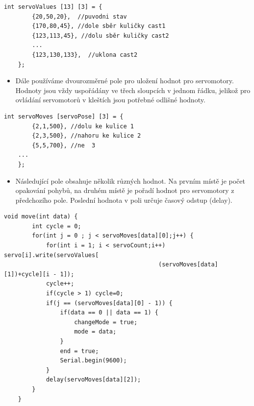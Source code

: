 \documentclass[12pt, a4paper,
twoside,        %
openright
]{report}
\begin{document}
{\begin{itemize}
	
\end{itemize}
	
\begin{lstlisting}[style=Python, caption={Dvourozměrné pole na potřebné hodnoty}]
	 int servoValues [13] [3] = {
		{20,50,20},  //puvodni stav 
		{170,80,45}, //dole sběr kuličky cast1
		{123,113,45}, //dolu sběr kuličky cast2
		...
		{123,130,133},  //uklona cast2
	};
		\end{lstlisting}
		
\begin{itemize}
	\item Dále používáme dvourozměrné pole pro uložení hodnot pro servomotory. Hodnoty jsou vždy uspořádány ve třech sloupcích v jednom řádku, jelikož pro ovládání servomotorů v kleštích jsou potřebné odlišné hodnoty.
	
	
	
	

			
	\end{itemize}
	
\begin{lstlisting}[style=Python, caption={Další pole pro několik hodnot }]
	int servoMoves [servoPose] [3] = {
		{2,1,500}, //dolu ke kulice 1
		{2,3,500}, //nahoru ke kulice 2
		{5,5,700}, //ne  3
	...
	};	
	\end{lstlisting}
	
	\begin{itemize}
		\item Následující pole obsahuje několik různých hodnot. Na prvním místě je počet opakování pohybů, na druhém místě je pořadí hodnot pro servomotory z předchozího pole. Poslední hodnota v poli určuje časový odstup (delay).
		
		
		
		
		
		
		
		
	\end{itemize}

\begin{lstlisting}[style=Python, caption={Funkce na rozpohybocání ramene}]	
	void move(int data) {
		int cycle = 0;
		for(int j = 0 ; j < servoMoves[data][0];j++) {
			for(int i = 1; i < servoCount;i++) servo[i].write(servoValues[
											(servoMoves[data][1])+cycle][i - 1]);
			cycle++;
			if(cycle > 1) cycle=0;
			if(j == (servoMoves[data][0] - 1)) {
				if(data == 0 || data == 1) {
					changeMode = true;
					mode = data;
				}
				end = true;
				Serial.begin(9600);
			}
			delay(servoMoves[data][2]);
		}
	}
	

\end{lstlisting}}
\end{document}
